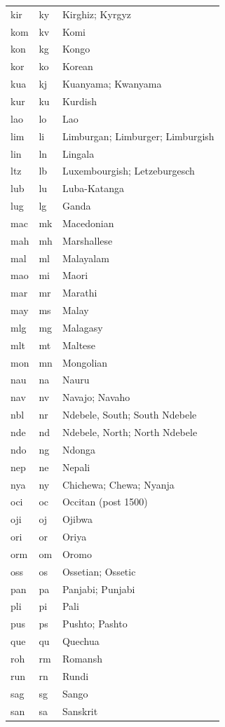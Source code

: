 \begin{longtable}{|L{3cm}|L{3cm}|L{5cm}|}
kir & ky & Kirghiz; Kyrgyz\\
kom & kv & Komi\\
kon & kg & Kongo\\
kor & ko & Korean\\
kua & kj & Kuanyama; Kwanyama\\
kur & ku & Kurdish\\
lao & lo & Lao\\
lim & li & Limburgan; Limburger; Limburgish\\
lin & ln & Lingala\\
ltz & lb & Luxembourgish; Letzeburgesch\\
lub & lu & Luba-Katanga\\
lug & lg & Ganda\\
mac & mk & Macedonian\\
mah & mh & Marshallese\\
mal & ml & Malayalam\\
mao & mi & Maori\\
mar & mr & Marathi\\
may & ms & Malay\\
mlg & mg & Malagasy\\
mlt & mt & Maltese\\
mon & mn & Mongolian\\
nau & na & Nauru\\
nav & nv & Navajo; Navaho\\
nbl & nr & Ndebele, South; South Ndebele\\
nde & nd & Ndebele, North; North Ndebele\\
ndo & ng & Ndonga\\
nep & ne & Nepali\\
nya & ny & Chichewa; Chewa; Nyanja\\
oci & oc & Occitan (post 1500)\\
oji & oj & Ojibwa\\
ori & or & Oriya\\
orm & om & Oromo\\
oss & os & Ossetian; Ossetic\\
pan & pa & Panjabi; Punjabi\\
pli & pi & Pali\\
pus & ps & Pushto; Pashto\\
que & qu & Quechua\\
roh & rm & Romansh\\
run & rn & Rundi\\
sag & sg & Sango\\
san & sa & Sanskrit\\

\end{longtable}
